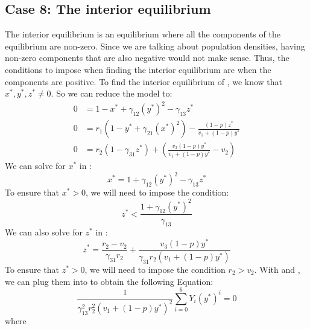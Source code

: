 \subsection{Case 8: The interior equilibrium}\label{subsec:interior_equilibrium}
The interior equilibrium is an equilibrium where all the components of the equilibrium are non-zero. Since we are talking about population densities, having non-zero components that are also negative would not make sense. Thus, the conditions to impose when finding the interior equilibrium are when the components are positive. To find the interior equilibrium of , we know that $x^*,y^*,z^*\neq0$. So we can reduce the model to:
\begin{subequations}
    \begin{align}
        0 &= 1-x^*+\gamma_{12}\left(y^*\right)^2-\gamma_{13}z^*
        \label{eq:4.21a}\\
        0 &= r_1\left(1-y^*+\gamma_{21}\left(x^*\right)^2\right)-\frac{\left(1-p\right)z^*}{v_1+\left(1-p\right)y^*}
        \label{eq:4.21b}\\
        0 &= r_2\left(1-\gamma_{31}z^*\right)+\left(\frac{v_3\left(1-p\right)y^*}{v_1+\left(1-p\right)y^*}-v_2\right)
        \label{eq:4.21c}
    \end{align}
    \label{eq:4.21}
\end{subequations}
We can solve for $x^*$ in :
\begin{equation}
    x^*=1+\gamma_{12}\left(y^*\right)^2-\gamma_{13}z^*
    \label{eq:4.22}
\end{equation}
To ensure that $x^*>0$, we will need to impose the condition:
\[
z^*<\frac{1+\gamma_{12}\left(y^*\right)^2}{\gamma_{13}}
\]
We can also solve for $z^*$ in :
\begin{equation}
    z^*=\frac{r_2-v_2}{\gamma_{31}r_2}+\frac{v_3\left(1-p\right)y^*}{\gamma_{31}r_2\left(v_1+\left(1-p\right)y^*\right)}
    \label{eq:4.23}
\end{equation}
To ensure that $z^*>0$, we will need to impose the condition $r_2>v_2$. With  and , we can plug them into  to obtain the following Equation:
\begin{equation}
    \frac{1}{\gamma_{13}^2r_2^2\left(v_1+\left(1-p\right)y^*\right)^2}\sum_{i=0}^6 Y_i\left(y^*\right)^i=0
    \label{eq:4.24}
\end{equation}
where
